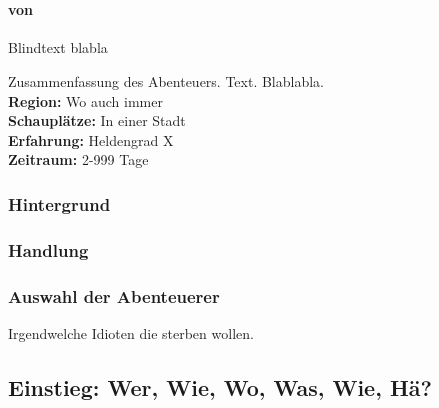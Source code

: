 \documentclass[12pt, a4paper, twoside, openany]{book}
\begin{document}
\chapter*{\MyTitle}%
\begin{multicols}{2}
        \subsubsection*{von \MyAuthor}
        Blindtext blabla
        \begin{spmbox}
                {\begin{center}
                                \color{spmblue}
                                \Large
                                \textbf{\MyTitle}
                \end{center}}
                Zusammenfassung des Abenteuers. Text. Blablabla. \\
                \textbf{Region:} Wo auch immer\\
                \textbf{Schauplätze:} In einer Stadt\\
                \textbf{Erfahrung:} Heldengrad X\\
                \textbf{Zeitraum:} 2-999 Tage\\
        \end{spmbox}
        \subsection*{Hintergrund}
        \Blindtext[1][1]
        \subsection*{Handlung}
        \Blindtext[1][1]
        \subsection*{Auswahl der Abenteuerer}
        Irgendwelche Idioten die sterben wollen.             
\end{multicols}
\section*{Einstieg: Wer, Wie, Wo, Was, Wie, Hä?}
\end{document}
